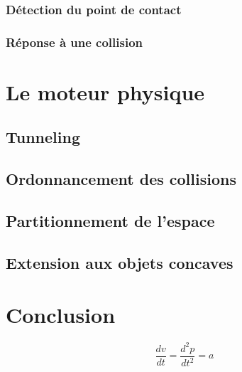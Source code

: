 \documentclass[twocolumn]{article}
\begin{document}
\subsubsection{Détection du point de contact}

\subsubsection{Réponse à une collision}

\section{Le moteur physique}

\subsection{Tunneling}

\subsection{Ordonnancement des collisions}

\subsection{Partitionnement de l'espace}

\subsection{Extension aux objets concaves}

\section{Conclusion}

\begin{equation}
  \frac{dv}{dt} = \frac{d^2p}{dt^2} = a 
\end{equation}



\end{document}
